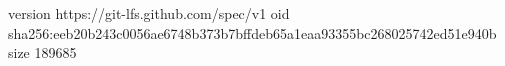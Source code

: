 version https://git-lfs.github.com/spec/v1
oid sha256:eeb20b243c0056ae6748b373b7bffdeb65a1eaa93355bc268025742ed51e940b
size 189685
